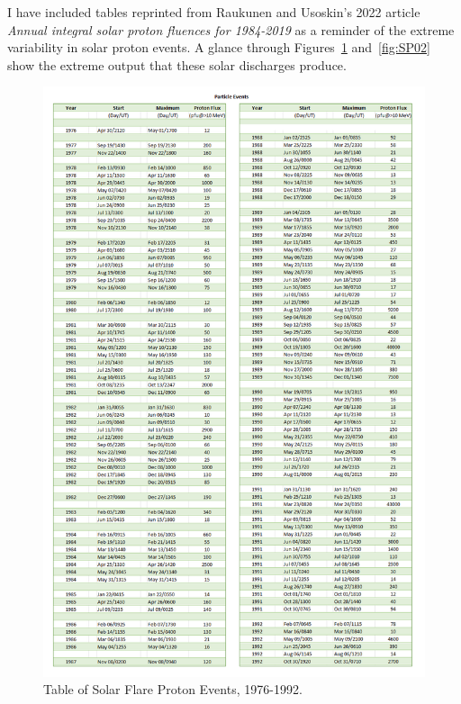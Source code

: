\documentclass[11pt]{article}
\begin{document}
I have included tables reprinted from Raukunen and Usoskin's 2022 article \textit{Annual integral solar proton fluences for 1984-2019} as a reminder of the extreme variability in solar proton events. A glance through Figures~\ref{fig:SP01} and~\ref{fig:SP02} show the extreme output that these solar discharges produce. 

\begin{figure}[H]
    \centering
        \includegraphics[width=.86\linewidth]{SolarFlareEvents01.png}
        \caption{Table of Solar Flare Proton Events, 1976-1992.}
        \label{fig:SP01}
\end{figure}
\end{document}
